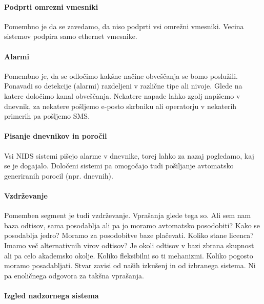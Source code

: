 \documentclass[12pt]{article}
\begin{document}

\paragraph{Podprti omrezni vmesniki} %

Pomembno je da se zavedamo, da niso podprti vsi omrežni vmesniki. Vecina sistemov podpira samo ethernet vmesnike.


\paragraph{Alarmi} %

Pomembno je, da se odločimo kakšne načine obveščanja se bomo poslužili. Ponavadi so detekcije (alarmi) razdeljeni v različne tipe ali nivoje.
Glede na katere določimo kanal obveščanja. 
Nekatere napade lahko zgolj napišemo v dnevnik, za nekatere pošljemo e-posto skrbniku ali operatorju v nekaterih primerih pa pošljemo SMS.


\paragraph{Pisanje dnevnikov in poročil} %

Vsi NIDS sistemi pišejo alarme v dnevnike, torej lahko za nazaj pogledamo, kaj se je dogajalo. Določeni sistemi pa omogočajo tudi pošiljanje avtomatsko generiranih porocil (npr. dnevnih).

\paragraph{Vzdrževanje} %

Pomemben segment je tudi vzdrževanje. Vprašanja glede tega so. Ali sem nam baza odtisov, sama posodablja ali pa jo moramo avtomatsko posodobiti? Kako se posodablja jedro? Moramo za posodobitve baze plačevati. Koliko stane licenca?
Imamo več alternativnih virov odtisov? Je okoli odtisov v bazi zbrana skupnost ali pa celo akademsko okolje.
Koliko fleksibilni so ti mehanizmi. Koliko pogosto moramo posadabljati. 
Stvar zavisi od naših izkušenj in od izbranega sistema. Ni pa enoličnega odgovora za takšna vprašanja.


\paragraph{Izgled nadzornega sistema} %
\end{document}
